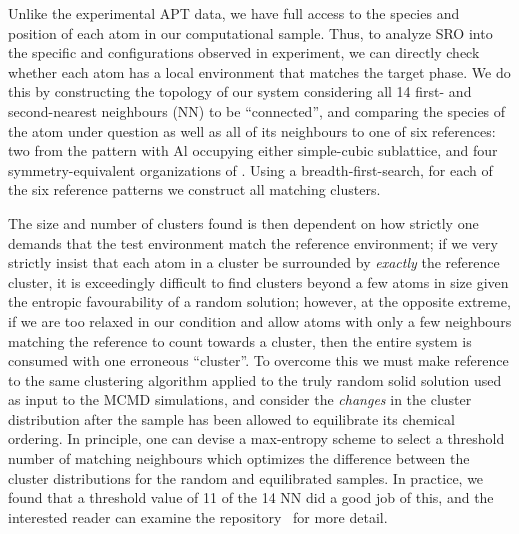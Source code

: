 Unlike the experimental APT data, we have full access to the species and position of each atom in our computational sample.
Thus, to analyze SRO into the specific \DOTHREE and \BTWO configurations observed in experiment, we can directly check whether each atom has a local environment that matches the target phase.
We do this by constructing the topology of our system considering all 14 first- and second-nearest neighbours (NN) to be ``connected'', and comparing the species of the atom under question as well as all of its neighbours to one of six references: two from the \BTWO pattern with Al occupying either simple-cubic sublattice, and four symmetry-equivalent organizations of \DOTHREE.
Using a breadth-first-search, for each of the six reference patterns we construct all matching clusters.

The size and number of clusters found is then dependent on how strictly one demands that the test environment match the reference environment;
if we very strictly insist that each atom in a cluster be surrounded by \emph{exactly} the reference cluster, it is exceedingly difficult to find clusters beyond a few atoms in size given the entropic favourability of a random solution;
however, at the opposite extreme, if we are too relaxed in our condition and allow atoms with only a few neighbours matching the reference to count towards a cluster, then the entire system is consumed with one erroneous ``cluster''.
To overcome this we must make reference to the same clustering algorithm applied to the truly random solid solution used as input to the MCMD simulations, and consider the \emph{changes} in the cluster distribution after the sample has been allowed to equilibrate its chemical ordering.
In principle, one can devise a max-entropy scheme to select a threshold number of matching neighbours which optimizes the difference between the cluster distributions for the random and equilibrated samples.
In practice, we found that a threshold value of 11 of the 14 NN did a good job of this, and the interested reader can examine the  repository~\cite{github} for more detail.

